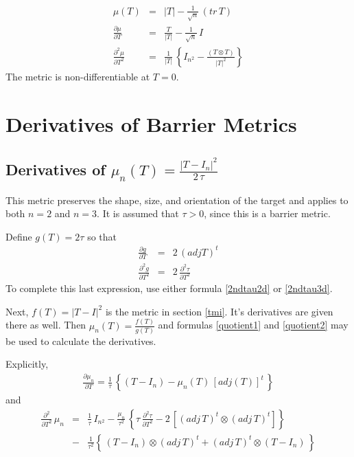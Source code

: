 \documentclass{report}
\begin{document}
\begin{eqnarray}
\mu(T) & = & |T| - \frac{1}{\sqrt{n}} \, \left( tr \, T \right) \\
\frac{\partial \mu}{\partial T} & = & \frac{T}{|T|} - \frac{1}{\sqrt{n}} \, I \\\frac{\partial^2 \mu}{\partial T^2} & = & \frac{1}{|T|} \, \left\{ I_{n^2} - \frac{(T \otimes T)}{|T|^2}\right\}
\end{eqnarray}
The metric is non-differentiable at $T=0$. \newline

\section{Derivatives of Barrier Metrics}

\subsection{Derivatives of $\mu_n(T)=\frac{|T-I_n|^2}{2 \, \tau}$ \label{sso+}}

\noindent This metric preserves the shape, size, and orientation of the target
and applies to both $n=2$ and $n=3$. It is assumed that $\tau>0$, since 
this is a barrier metric. \newline

\noindent Define $g(T)=2 \tau$ so that
\begin{eqnarray}
\frac{\partial g}{\partial T} & = & 2 \, (adj T)^t \\
\frac{\partial^2 g}{\partial T^2} & = & 2 \, \frac{\partial^2 \tau}{\partial T^2}
\end{eqnarray}
To complete this last expression, use either formula \ref{2ndtau2d} or \ref{2ndtau3d}. \newline

\noindent Next, $f(T)=|T-I|^2$ is the metric in section \ref{tmi}. It's
derivatives are given there as well. Then $\mu_n(T) = \frac{f(T)}{g(T)}$ 
and formulas \ref{quotient1} and \ref{quotient2} may be used to calculate the derivatives.  \newline

\noindent Explicitly, 
\begin{eqnarray}
\frac{\partial \mu_n}{\partial T} = \frac{1}{\tau} \, \left\{ \left( T - I_n \right) - \mu_n(T) \, \left[ adj(T) \right]^t \, \right\}
\end{eqnarray}
and 
\begin{eqnarray}
\frac{\partial^2}{\partial T^2} \, \mu_n & = & \frac{1}{\tau} \, I_{n^2} - \frac{\mu_n}{\tau^2} \, \left\{ \tau \, \frac{\partial^2 \tau}{\partial T^2} - 2 \, \left[ (adj \, T)^t \otimes (adj \, T)^t \right] \right\} \nonumber \\
 & - & \frac{1}{\tau^2} \left\{ \, (T-I_n) \otimes (adj \, T)^t + (adj \, T)^t \otimes (T-I_n) \, \right\}
\end{eqnarray}
\end{document}
